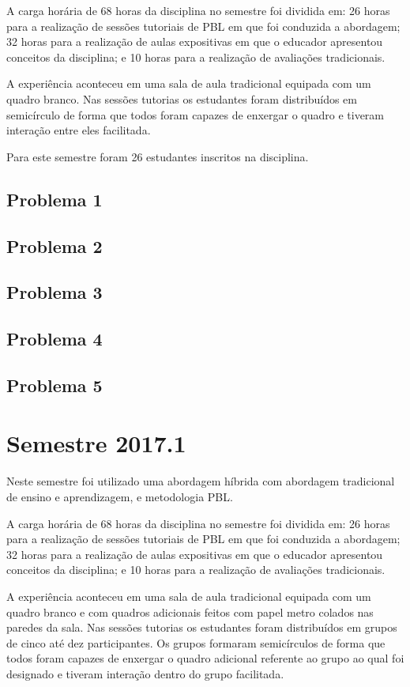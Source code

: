 A carga horária de 68 horas da disciplina no semestre foi dividida em:
26 horas para a realização de sessões tutoriais de PBL em que foi conduzida a abordagem;
32 horas para a realização de aulas expositivas em que o educador apresentou conceitos da disciplina;
e 10 horas para a realização de avaliações tradicionais.

A experiência aconteceu em uma sala de aula tradicional equipada com um
quadro branco.
Nas sessões tutorias os estudantes foram distribuídos em semicírculo de forma que todos foram capazes de
enxergar o quadro e tiveram interação entre eles facilitada.

Para este semestre foram 26 estudantes inscritos na disciplina.

\subsection{Problema 1}
\subsection{Problema 2}
\subsection{Problema 3}
\subsection{Problema 4}
\subsection{Problema 5}

\section{Semestre 2017.1}
Neste semestre foi utilizado uma abordagem híbrida com abordagem tradicional de ensino
e aprendizagem, e metodologia PBL.

A carga horária de 68 horas da disciplina no semestre foi dividida em:
26 horas para a realização de sessões tutoriais de PBL em que foi conduzida a abordagem;
32 horas para a realização de aulas expositivas em que o educador apresentou conceitos da disciplina;
e 10 horas para a realização de avaliações tradicionais.

A experiência aconteceu em uma sala de aula tradicional equipada com um
quadro branco e com quadros adicionais feitos com papel metro colados nas paredes da sala.
Nas sessões tutorias os estudantes foram distribuídos em grupos de cinco até dez participantes.
Os grupos formaram semicírculos de forma que todos foram capazes de
enxergar o quadro adicional referente ao grupo ao qual foi designado
e tiveram interação dentro do grupo facilitada.

